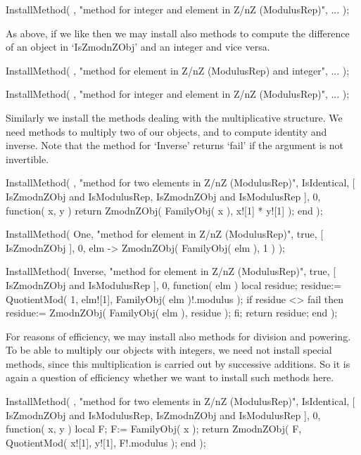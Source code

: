     InstallMethod( \+,
        "method for integer and element in Z/nZ (ModulusRep)",
        ... );
\endexample

As above, if we like then we may install also methods to compute the
difference of an object in `IsZmodnZObj' and an integer and vice versa.

\beginexample
    InstallMethod( \-,
        "method for element in Z/nZ (ModulusRep) and integer",
        ... );

    InstallMethod( \-,
        "method for integer and element in Z/nZ (ModulusRep)",
        ... );
\endexample

Similarly we install the methods dealing with the multiplicative
structure.
We need methods to multiply two of our objects,
and to compute identity and inverse.
Note that the method for `Inverse' returns `fail' if the argument
is not invertible.

\beginexample
    InstallMethod( \*,
        "method for two elements in Z/nZ (ModulusRep)",
        IsIdentical,
        [ IsZmodnZObj and IsModulusRep, IsZmodnZObj and IsModulusRep ], 0,
        function( x, y )
        return ZmodnZObj( FamilyObj( x ), x![1] * y![1] );
        end );

    InstallMethod( One,
        "method for element in Z/nZ (ModulusRep)",
        true,
        [ IsZmodnZObj ], 0,
        elm -> ZmodnZObj( FamilyObj( elm ), 1 ) );

    InstallMethod( Inverse,
        "method for element in Z/nZ (ModulusRep)",
        true,
        [ IsZmodnZObj and IsModulusRep ], 0,
        function( elm )
        local residue;
        residue:= QuotientMod( 1, elm![1], FamilyObj( elm )!.modulus );
        if residue <> fail then
          residue:= ZmodnZObj( FamilyObj( elm ), residue );
        fi;
        return residue;
        end );
\endexample

For reasons of efficiency, we may install also methods for division
and powering.
To be able to multiply our objects with integers,
we need not install special methods,
since this multiplication is carried out by successive additions.
So it is again a question of efficiency whether we want to install
such methods here.

\beginexample
    InstallMethod( \/,
        "method for two elements in Z/nZ (ModulusRep)",
        IsIdentical,
        [ IsZmodnZObj and IsModulusRep, IsZmodnZObj and IsModulusRep ], 0,
        function( x, y )
        local F;
        F:= FamilyObj( x );
        return ZmodnZObj( F, QuotientMod( x![1], y![1], F!.modulus );
        end );


